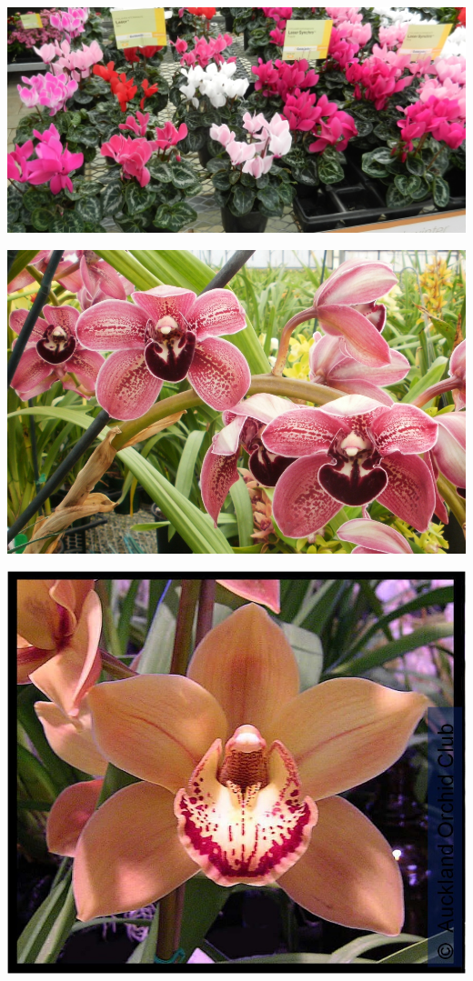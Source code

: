 \documentclass{article}
\begin{document}
\begin{center}
\includegraphics[width=0.9\textheight, angle=90]{../Cyclamen.jpg}
\end{center}
\newpage

\begin{center}
\includegraphics[width=0.9\textheight, angle=90]{../Cymbidium.jpg}
\end{center}
\newpage

\begin{center}
\includegraphics[width=0.9\textheight, angle=90]{../Cymbidium2.jpg}
\end{center}
\newpage
\end{document}
